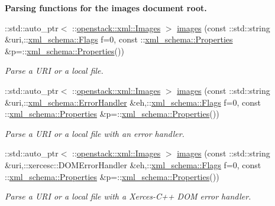 \begin{Indent}{\bf Parsing functions for the images document root.}\par
\begin{DoxyCompactItemize}
\item 
::std::auto\_\-ptr$<$ ::\hyperlink{classopenstack_1_1xml_1_1Images}{openstack::xml::Images} $>$ \hyperlink{namespaceopenstack_1_1xml_ade173ba96918e59104cddd1acd29e294}{images} (const ::std::string \&uri,::\hyperlink{namespacexml__schema_affb4c227cbd9aa7453dd1dc5a1401943}{xml\_\-schema::Flags} f=0, const ::\hyperlink{namespacexml__schema_ad27ce19a7ee1d3b1064092648898f64c}{xml\_\-schema::Properties} \&p=::\hyperlink{namespacexml__schema_ad27ce19a7ee1d3b1064092648898f64c}{xml\_\-schema::Properties}())
\begin{DoxyCompactList}\small\item\em Parse a URI or a local file. \item\end{DoxyCompactList}\item 
::std::auto\_\-ptr$<$ ::\hyperlink{classopenstack_1_1xml_1_1Images}{openstack::xml::Images} $>$ \hyperlink{namespaceopenstack_1_1xml_afed9097c8a52f77cb8f49a9bc4b6fc9d}{images} (const ::std::string \&uri,::\hyperlink{namespacexml__schema_ab1c9361bfd3b404eaabf0c31eded79dc}{xml\_\-schema::ErrorHandler} \&eh,::\hyperlink{namespacexml__schema_affb4c227cbd9aa7453dd1dc5a1401943}{xml\_\-schema::Flags} f=0, const ::\hyperlink{namespacexml__schema_ad27ce19a7ee1d3b1064092648898f64c}{xml\_\-schema::Properties} \&p=::\hyperlink{namespacexml__schema_ad27ce19a7ee1d3b1064092648898f64c}{xml\_\-schema::Properties}())
\begin{DoxyCompactList}\small\item\em Parse a URI or a local file with an error handler. \item\end{DoxyCompactList}\item 
::std::auto\_\-ptr$<$ ::\hyperlink{classopenstack_1_1xml_1_1Images}{openstack::xml::Images} $>$ \hyperlink{namespaceopenstack_1_1xml_abc828b60f8e74adcc97bb0b1d61378f1}{images} (const ::std::string \&uri,::xercesc::DOMErrorHandler \&eh,::\hyperlink{namespacexml__schema_affb4c227cbd9aa7453dd1dc5a1401943}{xml\_\-schema::Flags} f=0, const ::\hyperlink{namespacexml__schema_ad27ce19a7ee1d3b1064092648898f64c}{xml\_\-schema::Properties} \&p=::\hyperlink{namespacexml__schema_ad27ce19a7ee1d3b1064092648898f64c}{xml\_\-schema::Properties}())
\begin{DoxyCompactList}\small\item\em Parse a URI or a local file with a Xerces-\/C++ DOM error handler. \item\end{DoxyCompactList}\item 

\end{DoxyCompactItemize}
\end{Indent}

